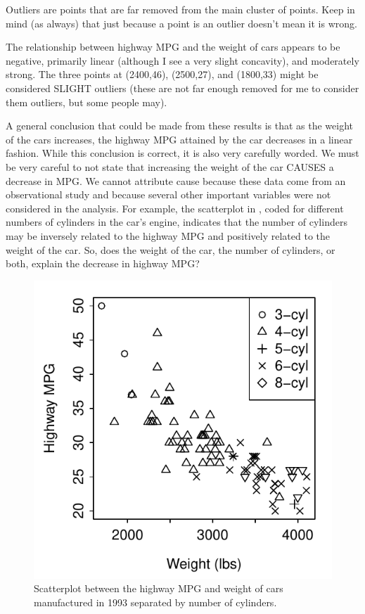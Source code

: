 \documentclass[10pt,openany]{book}\usepackage[]{graphicx}\usepackage[]{color}
\newenvironment{knitrout}{}{} %
\begin{document}

\vspace{-12pt}

Outliers are points that are far removed from the main cluster of points.  Keep in mind (as always) that just because a point is an outlier doesn't mean it is wrong.

The relationship between highway MPG and the weight of cars  appears to be negative, primarily linear (although I see a very slight concavity), and moderately strong.  The three points at (2400,46), (2500,27), and (1800,33) might be considered SLIGHT outliers (these are not far enough removed for me to consider them outliers, but some people may).

A general conclusion that could be made from these results is that as the weight of the cars increases, the highway MPG attained by the car decreases in a linear fashion.  While this conclusion is correct, it is also very carefully worded.  We must be very careful to not state that increasing the weight of the car CAUSES a decrease in MPG.  We cannot attribute cause because these data come from an observational study and because several other important variables were not considered in the analysis.  For example, the scatterplot in , coded for different numbers of cylinders in the car's engine, indicates that the number of cylinders may be inversely related to the highway MPG and positively related to the weight of the car.  So, does the weight of the car, the number of cylinders, or both, explain the decrease in highway MPG?

\begin{knitrout}
\color{fgcolor}\begin{figure}[hbtp]

{\centering \includegraphics[width=.4\linewidth]{Figs/carscat2-1} 

}

\caption[Scatterplot between the highway MPG and weight of cars manufactured in 1993 separated by number of cylinders]{Scatterplot between the highway MPG and weight of cars manufactured in 1993 separated by number of cylinders.}\label{fig:carscat2}
\end{figure}


\end{knitrout}
\end{document}
